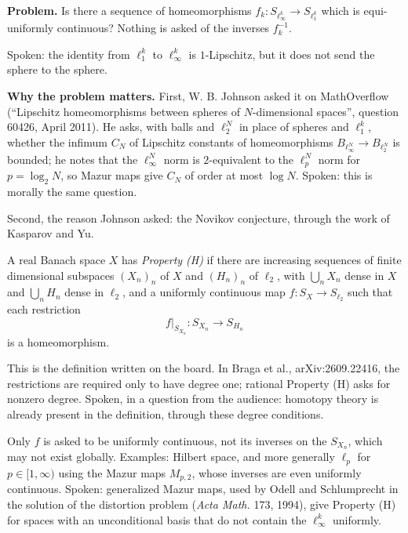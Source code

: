 \medskip\noindent
{\bf Problem.} Is there a sequence of
homeomorphisms
$f_k : S_{\ell_\infty^k} \to S_{\ell_1^k}$
which is equi-uniformly continuous? Nothing
is asked of the inverses $f_k^{-1}$.

Spoken: the identity from $\ell_1^k$ to
$\ell_\infty^k$ is $1$-Lipschitz, but it does
not send the sphere to the sphere.

\medskip\noindent
{\bf Why the problem matters.} First, W. B.
Johnson asked it on MathOverflow
(``Lipschitz homeomorphisms between spheres
of $N$-dimensional spaces'', question 60426,
April 2011). He asks, with balls and
$\ell_2^N$ in place of spheres and
$\ell_1^k$, whether the infimum $C_N$ of
Lipschitz constants of homeomorphisms
$B_{\ell_\infty^N} \to B_{\ell_2^N}$ is
bounded; he notes that the $\ell_\infty^N$
norm is $2$-equivalent to the $\ell_p^N$ norm
for $p = \log_2 N$, so Mazur maps give
$C_N$ of order at most $\log N$. Spoken: this
is morally the same question.

Second, the reason Johnson asked: the Novikov
conjecture, through the work of Kasparov and
Yu.

\begin{definition}
\label{definition-property-h}
A real Banach space $X$ has
\emph{Property (H)} if there are increasing
sequences of finite dimensional subspaces
$(X_n)_n$ of $X$ and $(H_n)_n$ of $\ell_2$,
with $\bigcup_n X_n$ dense in $X$ and
$\bigcup_n H_n$ dense in $\ell_2$, and a
uniformly continuous map
$f : S_X \to S_{\ell_2}$ such that each
restriction
$$
f|_{S_{X_n}} : S_{X_n} \to S_{H_n}
$$
is a homeomorphism.
\end{definition}

\begin{remark}
\label{remark-property-h-degree-one}
This is the definition written on the board.
In Braga et al., arXiv:2609.22416, the
restrictions are required only to have
degree one; rational Property (H) asks for
nonzero degree. Spoken, in a question from
the audience: homotopy theory is already
present in the definition, through these
degree conditions.
\end{remark}

\noindent
Only $f$ is asked to be uniformly continuous,
not its inverses on the $S_{X_n}$, which may
not exist globally. Examples: Hilbert space,
and more generally $\ell_p$ for
$p \in [1,\infty)$ using the Mazur maps
$M_{p,2}$, whose inverses are even uniformly
continuous. Spoken: generalized Mazur maps,
used by Odell and Schlumprecht in the
solution of the distortion problem
(\emph{Acta Math.} 173, 1994), give
Property (H) for spaces with an unconditional
basis that do not contain the
$\ell_\infty^k$ uniformly.

